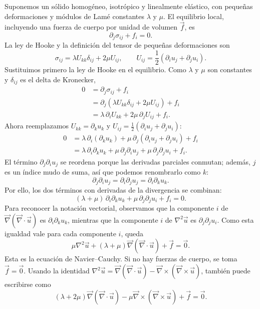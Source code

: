 \documentclass[a4paper]{article}
\begin{document}
Suponemos un sólido homogéneo, isotrópico y linealmente elástico, con pequeñas deformaciones y módulos de Lamé constantes $\lambda$ y $\mu$. El equilibrio local, incluyendo una fuerza de cuerpo por unidad de volumen $\vec f$, es
\[
\partial_j\sigma_{ij}+f_i=0.
\]
La ley de Hooke y la definición del tensor de pequeñas deformaciones son
\[
\sigma_{ij}=\lambda U_{kk}\delta_{ij}+2\mu U_{ij},
\qquad
U_{ij}=\frac{1}{2}(\partial_i u_j+\partial_j u_i).
\]
Sustituimos primero la ley de Hooke en el equilibrio. Como $\lambda$ y $\mu$ son constantes y $\delta_{ij}$ es el delta de Kronecker,
\[
\begin{aligned}
0
&=\partial_j\sigma_{ij}+f_i\\
&=\partial_j\left(\lambda U_{kk}\delta_{ij}+2\mu U_{ij}\right)+f_i\\
&=\lambda\,\partial_i U_{kk}+2\mu\,\partial_j U_{ij}+f_i.
\end{aligned}
\]
Ahora reemplazamos $U_{kk}=\partial_k u_k$ y
$U_{ij}=\tfrac12(\partial_i u_j+\partial_j u_i)$:
\[
\begin{aligned}
0
&=\lambda\,\partial_i(\partial_k u_k)
+\mu\,\partial_j\left(\partial_i u_j+\partial_j u_i\right)+f_i\\
&=\lambda\,\partial_i\partial_k u_k
+\mu\,\partial_j\partial_i u_j
+\mu\,\partial_j\partial_j u_i+f_i.
\end{aligned}
\]
El término $\partial_j\partial_i u_j$ se reordena porque las derivadas parciales conmutan; además, $j$ es un índice mudo de suma, así que podemos renombrarlo como $k$:
\[
\partial_j\partial_i u_j
=\partial_i\partial_j u_j
=\partial_i\partial_k u_k.
\]
Por ello, los dos términos con derivadas de la divergencia se combinan:
\[
(\lambda+\mu)\,\partial_i\partial_k u_k
+\mu\,\partial_j\partial_j u_i+f_i=0.
\]
Para reconocer la notación vectorial, observamos que la componente $i$ de
$\vec\nabla(\vec\nabla\cdot\vec u)$ es $\partial_i\partial_k u_k$, mientras que la componente $i$ de $\nabla^2\vec u$ es $\partial_j\partial_j u_i$. Como esta igualdad vale para cada componente $i$, queda
\[
\boxed{\mu\nabla^2\vec u+(\lambda+\mu)\vec\nabla(\vec\nabla\cdot\vec u)+\vec f=\vec 0.}
\]
Esta es la ecuación de Navier--Cauchy. Si no hay fuerzas de cuerpo, se toma $\vec f=\vec 0$. Usando la identidad $\nabla^2\vec u=\vec\nabla(\vec\nabla\cdot\vec u)-\vec\nabla\times(\vec\nabla\times\vec u)$, también puede escribirse como
\[
\boxed{(\lambda+2\mu)\vec\nabla(\vec\nabla\cdot\vec u)
-\mu\vec\nabla\times(\vec\nabla\times\vec u)+\vec f=\vec 0.}
\]
\end{document}
